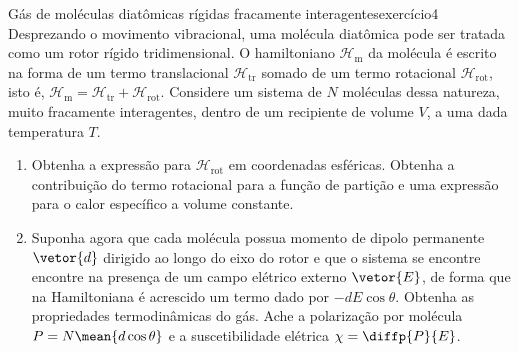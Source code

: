 \begin{exercício}{Gás de moléculas diatômicas rígidas fracamente interagentes}{exercício4}
    Desprezando o movimento vibracional, uma molécula diatômica pode ser tratada como um rotor rígido tridimensional. O hamiltoniano \(\mathcal{H}_{\mathrm{m}}\) da molécula é escrito na forma de um termo translacional \(\mathcal{H}_{\mathrm{tr}}\) somado de um termo rotacional \(\mathcal{H}_{\mathrm{rot}}\), isto é, \(\mathcal{H}_{\mathrm{m}}=\mathcal{H}_{\mathrm{tr}} + \mathcal{H}_{\mathrm{rot}}\). Considere um sistema de \(N\) moléculas dessa natureza, muito fracamente interagentes, dentro de um recipiente de volume \(V\), a uma dada temperatura \(T\).
    \begin{enumerate}[label=(\alph*)]
        \item Obtenha a expressão para \(\mathcal{H}_{\mathrm{rot}}\) em coordenadas esféricas. Obtenha a contribuição do termo rotacional para a função de partição e uma expressão para o calor específico a volume constante.
        \item Suponha agora que cada molécula possua momento de dipolo permanente \(\vetor{d}\) dirigido ao longo do eixo do rotor e que o sistema se encontre encontre na presença de um campo elétrico externo \(\vetor{E}\), de forma que na Hamiltoniana é acrescido um termo dado por \(-d E \cos\theta\). Obtenha as propriedades termodinâmicas do gás. Ache a polarização por molécula \(P = N\mean{d \cos\theta}\) e a suscetibilidade elétrica \(\chi = \diffp{P}{E}\).
    \end{enumerate}
\end{exercício}
